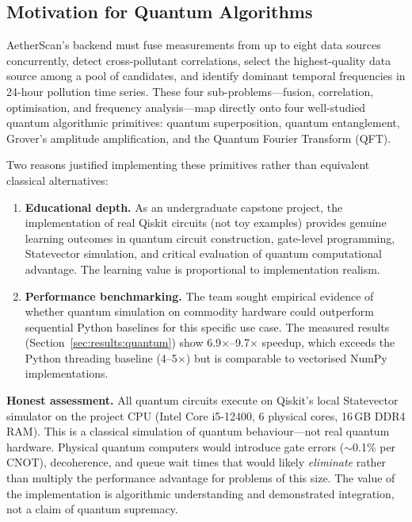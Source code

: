 \documentclass[12pt,a4paper]{article}
\begin{document}
\subsection{Motivation for Quantum Algorithms}
\label{sec:quantum:motivation}

AetherScan's backend must fuse measurements from up to eight data sources
concurrently, detect cross-pollutant correlations, select the highest-quality
data source among a pool of candidates, and identify dominant temporal
frequencies in 24-hour pollution time series. These four sub-problems---fusion,
correlation, optimisation, and frequency analysis---map directly onto four
well-studied quantum algorithmic primitives: quantum superposition, quantum
entanglement, Grover's amplitude amplification, and the Quantum Fourier
Transform (QFT).

Two reasons justified implementing these primitives rather than equivalent
classical alternatives:

\begin{enumerate}[leftmargin=*]
\item \textbf{Educational depth.} As an undergraduate capstone project, the
      implementation of real Qiskit circuits (not toy examples) provides
      genuine learning outcomes in quantum circuit construction, gate-level
      programming, Statevector simulation, and critical evaluation of
      quantum computational advantage. The learning value is proportional to
      implementation realism.
\item \textbf{Performance benchmarking.} The team sought empirical evidence
      of whether quantum simulation on commodity hardware could outperform
      sequential Python baselines for this specific use case. The measured
      results (Section~\ref{sec:results:quantum}) show 6.9$\times$--9.7$\times$
      speedup, which exceeds the Python threading baseline (4--5$\times$) but
      is comparable to vectorised NumPy implementations.
\end{enumerate}

\noindent\textbf{Honest assessment.}
All quantum circuits execute on Qiskit's local Statevector simulator on the
project CPU (Intel Core i5-12400, 6 physical cores, 16\,GB DDR4 RAM). This is
a classical simulation of quantum behaviour---not real quantum hardware.
Physical quantum computers would introduce gate errors ($\sim$0.1\% per CNOT),
decoherence, and queue wait times that would likely \emph{eliminate} rather
than multiply the performance advantage for problems of this size. The value of
the implementation is algorithmic understanding and demonstrated integration,
not a claim of quantum supremacy.
\end{document}
